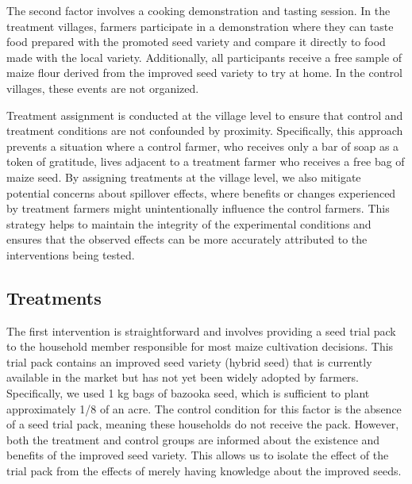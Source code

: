 \documentclass[english]{article}\usepackage[]{graphicx}\usepackage[]{xcolor}
\begin{document}
The second factor involves a cooking demonstration and tasting session.
In the treatment villages, farmers participate in a demonstration
where they can taste food prepared with the promoted seed variety
and compare it directly to food made with the local variety. Additionally,
all participants receive a free sample of maize flour derived from
the improved seed variety to try at home. In the control villages,
these events are not organized.

Treatment assignment is conducted at the village level to ensure that
control and treatment conditions are not confounded by proximity.
Specifically, this approach prevents a situation where a control farmer,
who receives only a bar of soap as a token of gratitude, lives adjacent
to a treatment farmer who receives a free bag of maize seed. By assigning
treatments at the village level, we also mitigate potential concerns
about spillover effects, where benefits or changes experienced by
treatment farmers might unintentionally influence the control farmers.
This strategy helps to maintain the integrity of the experimental
conditions and ensures that the observed effects can be more accurately
attributed to the interventions being tested. 

\subsection{Treatments}

The first intervention is straightforward and involves providing a
seed trial pack to the household member responsible for most maize
cultivation decisions. This trial pack contains an improved seed variety
(hybrid seed) that is currently available in the market but has not
yet been widely adopted by farmers. Specifically, we used 1 kg bags
of bazooka seed, which is sufficient to plant approximately 1/8 of
an acre. The control condition for this factor is the absence of a
seed trial pack, meaning these households do not receive the pack.
However, both the treatment and control groups are informed about
the existence and benefits of the improved seed variety. This allows
us to isolate the effect of the trial pack from the effects of merely
having knowledge about the improved seeds.
\end{document}
